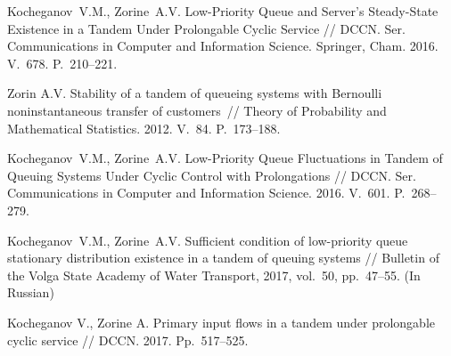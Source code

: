 \begin{references_eng}

\item
Kocheganov~V.M., Zorine~A.V. Low-Priority Queue and Server's Steady-State Existence in a Tandem Under Prolongable Cyclic Service // DCCN. Ser. Communications in Computer and Information Science. Springer, Cham. 2016. V.~678. P.~210--221.
\item
  Zorin A.V. Stability of a tandem of queueing systems with Bernoulli noninstantaneous transfer of
  customers~// Theory of Probability and Mathematical Statistics. 2012. V.~84. P.~173--188.
\item
Kocheganov~V.M., Zorine~A.V. Low-Priority Queue Fluctuations in Tandem of Queuing Systems Under Cyclic Control with Prolongations // DCCN. Ser. Communications in Computer and Information Science. 2016. V.~601. P.~268--279.
\item 
Kocheganov~V.M., Zorine~A.V. Sufficient condition of low-priority queue stationary distribution existence in a tandem of queuing systems // Bulletin of the Volga State Academy of Water Transport, 2017, vol.~50, pp.~47--55. (In Russian)
\item
Kocheganov V., Zorine A. Primary input flows in a tandem under prolongable cyclic service // DCCN. 2017. Pp.~517--525.







\end{references_eng}



